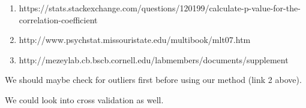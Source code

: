 \documentclass[12pt]{amsart}
\theoremstyle{plain}
\theoremstyle{definition}
\begin{document}
\begin{enumerate}
  \item https://stats.stackexchange.com/questions/120199/calculate-p-value-for-the-correlation-coefficient
  \item http://www.psychstat.missouristate.edu/multibook/mlt07.htm
  \item http://mezeylab.cb.bscb.cornell.edu/labmembers/documents/supplement%
\end{enumerate}

We should maybe check for outliers first before using our method (link 2 above).

We could look into cross validation as well.
\end{document}
